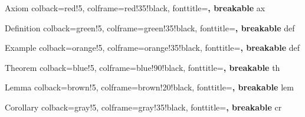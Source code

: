 
\newcommand{\R}{\mathbb{R}}
\newcommand{\C}{\mathbb{C}}
\newcommand{\Q}{\mathbb{Q}}
\newcommand{\Z}{\mathbb{Z}}
\newcommand{\F}{\mathbb{F}}
\newcommand{\N}{\mathbb{N}}


\usepackage[margin=1in]{geometry}
\usepackage{amssymb, amsthm, hyperref}
\usepackage[many, breakable]{tcolorbox}
\usepackage{adjustbox}
\usepackage[T1]{fontenc}
\usepackage{mathtools}
\usepackage{ragged2e}
\usepackage[framemethod=TikZ]{mdframed}
\renewcommand\qedsymbol{$\blacksquare$}
\usepackage[linesnumbered,ruled,vlined]{algorithm2e}



  {Axiom}%
  {%
    colback=red!5,
    colframe=red!35!black,
    fonttitle=\bfseries,
    breakable
  }%
  {ax}%



  {Definition}%
  {%
    colback=green!5,
    colframe=green!35!black,
    fonttitle=\bfseries,
    breakable
  }%
  {def}%


  {Example}%
  {%
    colback=orange!5,
    colframe=orange!35!black,
    fonttitle=\bfseries,
    breakable
  }%
  {def}%



  {Theorem}%
  {%
    colback=blue!5,
    colframe=blue!90!black,
    fonttitle=\bfseries,
    breakable
  }%
  {th}%



  {Lemma}%
  {%
    colback=brown!5,
    colframe=brown!20!black,
    fonttitle=\bfseries,
    breakable
  }%
  {lem}%


  {Corollary}%
  {%
    colback=gray!5,
    colframe=gray!35!black,
    fonttitle=\bfseries,
    breakable
  }%
  {cr}%



